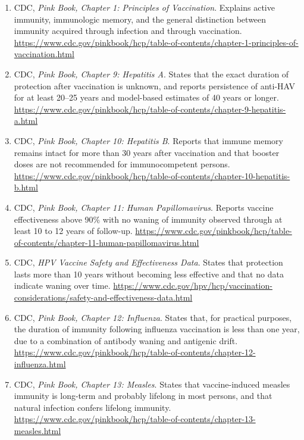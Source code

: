 \documentclass[11pt]{article}
\begin{document}
\begin{enumerate}

\item \label{ref:pinkbook-ch1} CDC, \emph{Pink Book, Chapter 1: Principles
of Vaccination}. Explains active immunity, immunologic memory, and the
general distinction between immunity acquired through infection and
through vaccination.
\url{https://www.cdc.gov/pinkbook/hcp/table-of-contents/chapter-1-principles-of-vaccination.html}

\item \label{ref:pinkbook-ch9} CDC, \emph{Pink Book, Chapter 9: Hepatitis
A}. States that the exact duration of protection after vaccination is
unknown, and reports persistence of anti-HAV for at least 20--25 years and
model-based estimates of 40 years or longer.
\url{https://www.cdc.gov/pinkbook/hcp/table-of-contents/chapter-9-hepatitis-a.html}

\item \label{ref:pinkbook-ch10} CDC, \emph{Pink Book, Chapter 10: Hepatitis
B}. Reports that immune memory remains intact for more than 30 years after
vaccination and that booster doses are not recommended for immunocompetent
persons.
\url{https://www.cdc.gov/pinkbook/hcp/table-of-contents/chapter-10-hepatitis-b.html}

\item \label{ref:pinkbook-ch11} CDC, \emph{Pink Book, Chapter 11: Human
Papillomavirus}. Reports vaccine effectiveness above 90\% with no waning of
immunity observed through at least 10 to 12 years of follow-up.
\url{https://www.cdc.gov/pinkbook/hcp/table-of-contents/chapter-11-human-papillomavirus.html}

\item \label{ref:cdc-hpv-safety} CDC, \emph{HPV Vaccine Safety and
Effectiveness Data}. States that protection lasts more than 10 years
without becoming less effective and that no data indicate waning over time.
\url{https://www.cdc.gov/hpv/hcp/vaccination-considerations/safety-and-effectiveness-data.html}

\item \label{ref:pinkbook-ch12} CDC, \emph{Pink Book, Chapter 12:
Influenza}. States that, for practical purposes, the duration of immunity
following influenza vaccination is less than one year, due to a
combination of antibody waning and antigenic drift.
\url{https://www.cdc.gov/pinkbook/hcp/table-of-contents/chapter-12-influenza.html}

\item \label{ref:pinkbook-ch13} CDC, \emph{Pink Book, Chapter 13:
Measles}. States that vaccine-induced measles immunity is long-term and
probably lifelong in most persons, and that natural infection confers
lifelong immunity.
\url{https://www.cdc.gov/pinkbook/hcp/table-of-contents/chapter-13-measles.html}


\end{enumerate}
\end{document}
